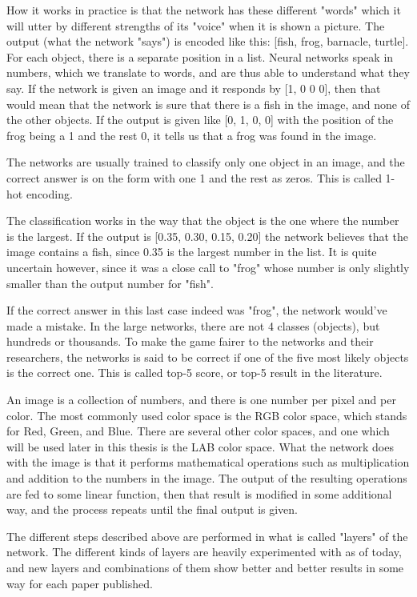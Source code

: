 How it works in practice is that the network has these different "words" which it will utter by different strengths of its "voice" when it is shown a picture. The output (what the network "says") is encoded like this: [fish, frog, barnacle, turtle]. For each object, there is a separate position in a list. Neural networks speak in numbers, which we translate to words, and are thus able to understand what they say. If the network is given an image and it responds by [1, 0 0 0], then that would mean that the network is sure that there is a fish in the image, and none of the other objects. If the output is given like [0, 1, 0, 0] with the position of the frog being a 1 and the rest 0, it tells us that a frog was found in the image. 

The networks are usually trained to classify only one object in an image, and the correct answer is on the form with one 1 and the rest as zeros. This is called 1-hot encoding. 

The classification works in the way that the object is the one where the number is the largest. If the output is [0.35, 0.30, 0.15, 0.20] the network believes that the image contains a fish, since 0.35 is the largest number in the list. It is quite uncertain however, since it was a close call to "frog" whose number is only slightly smaller than the output number for "fish". 

If the correct answer in this last case indeed was "frog", the network would've made a mistake. In the large networks, there are not 4 classes (objects), but hundreds or thousands. To make the game fairer to the networks and their researchers, the networks is said to be correct if one of the five most likely objects is the correct one. This is called top-5 score, or top-5 result in the literature. 

An image is a collection of numbers, and there is one number per pixel and per color. The most commonly used color space is the RGB color space, which stands for Red, Green, and Blue. There are several other color spaces, and one which will be used later in this thesis is the LAB color space. What the network does with the image is that it performs mathematical operations such as multiplication and addition to the numbers in the image. The output of the resulting operations are fed to some linear function, then that result is modified in some additional way, and the process repeats until the final output is given. 

The different steps described above are performed in what is called "layers" of the network. The different kinds of layers are heavily experimented with as of today, and new layers and combinations of them show better and better results in some way for each paper published. 

